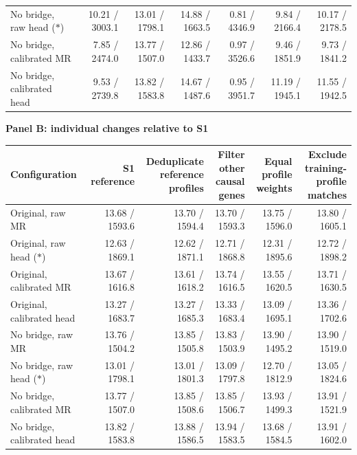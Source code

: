 \begin{landscape}
\begin{table}[p]
\begin{adjustbox}{max width=\linewidth}
\begin{tabular}{lrrrrrr}
No bridge, raw head ($\ast$) & 10.21 / 3003.1 & 13.01 / 1798.1 & 14.88 / 1663.5 & 0.81 / 4346.9 & 9.84 / 2166.4 & 10.17 / 2178.5 \\
No bridge, calibrated MR & 7.85 / 2474.0 & 13.77 / 1507.0 & 12.86 / 1433.7 & 0.97 / 3526.6 & 9.46 / 1851.9 & 9.73 / 1841.2 \\
No bridge, calibrated head & 9.53 / 2739.8 & 13.82 / 1583.8 & 14.67 / 1487.6 & 0.95 / 3951.7 & 11.19 / 1945.1 & 11.55 / 1942.5 \\
\bottomrule
\end{tabular}
\end{adjustbox}
\par\medskip
\textbf{Panel B: individual changes relative to S1}\par\smallskip
\begin{adjustbox}{max width=\linewidth}
\begin{tabular}{lrrrrr}
\toprule
Configuration & S1 reference & \shortstack{Deduplicate\\reference profiles} & \shortstack{Filter other\\causal genes} & \shortstack{Equal profile\\weights} & \shortstack{Exclude training-\\profile matches} \\
\midrule
Original, raw MR & 13.68 / 1593.6 & 13.70 / 1594.4 & 13.70 / 1593.3 & 13.75 / 1596.0 & 13.80 / 1605.1 \\
Original, raw head ($\ast$) & 12.63 / 1869.1 & 12.62 / 1871.1 & 12.71 / 1868.8 & 12.31 / 1895.6 & 12.72 / 1898.2 \\
Original, calibrated MR & 13.67 / 1616.8 & 13.61 / 1618.2 & 13.74 / 1616.5 & 13.55 / 1620.5 & 13.71 / 1630.5 \\
Original, calibrated head & 13.27 / 1683.7 & 13.27 / 1685.3 & 13.33 / 1683.4 & 13.09 / 1695.1 & 13.36 / 1702.6 \\
No bridge, raw MR & 13.76 / 1504.2 & 13.85 / 1505.8 & 13.83 / 1503.9 & 13.90 / 1495.2 & 13.90 / 1519.0 \\
No bridge, raw head ($\ast$) & 13.01 / 1798.1 & 13.01 / 1801.3 & 13.09 / 1797.8 & 12.70 / 1812.9 & 13.05 / 1824.6 \\
No bridge, calibrated MR & 13.77 / 1507.0 & 13.85 / 1508.6 & 13.85 / 1506.7 & 13.93 / 1499.3 & 13.91 / 1521.9 \\
No bridge, calibrated head & 13.82 / 1583.8 & 13.88 / 1586.5 & 13.94 / 1583.5 & 13.68 / 1584.5 & 13.91 / 1602.0 \\
\bottomrule
\end{tabular}
\end{adjustbox}
\end{table}
\clearpage
\end{landscape}
